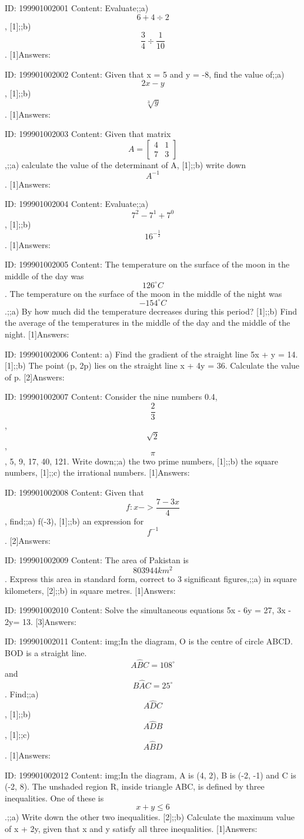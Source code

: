 \documentclass{article}
\begin{document}
ID: 199901002001
Content:
Evaluate;;a) $$6+4\div2$$, [1];;b) $$\frac{3}{4}\div \frac{1}{10}$$. [1]Answers:

ID: 199901002002
Content:
Given that x = 5 and y = -8, find the value of;;a) $$2x - y$$, [1];;b) $$\sqrt[3]{y}$$. [1]Answers:

ID: 199901002003
Content:
Given that matrix $$A=\begin{bmatrix}4&1\\7&3\end{bmatrix}$$,;;a) calculate the value of the determinant of A, [1];;b) write down $$A^{-1}$$. [1]Answers:

ID: 199901002004
Content:
Evaluate;;a) $$7^{2} -7^{1} +7^{0} $$, [1];;b) $$16^{-\frac{1}{2}}$$. [1]Answers:

ID: 199901002005
Content:
The temperature on the surface of the moon in the middle of the day was $$126^{\circ}C$$. The temperature on the surface of the moon in the middle of the night was $$-154^{\circ}C$$.;;a) By how much did the temperature decreases during this period? [1];;b) Find the average of the temperatures in the middle of the day and the middle of the night. [1]Answers:

ID: 199901002006
Content:
a) Find the gradient of the straight line 5x + y = 14. [1];;b) The point (p, 2p) lies on the straight line x + 4y = 36. Calculate the value of p. [2]Answers:

ID: 199901002007
Content:
Consider the nine numbers 0.4, $$\frac{2}{3}$$, $$\sqrt{2}$$, $$\pi$$, 5, 9, 17, 40, 121. Write down;;a) the two prime numbers, [1];;b) the square numbers, [1];;c) the irrational numbers. [1]Answers:

ID: 199901002008
Content:
Given that $$f:x->\frac{7-3x}{4}$$, find;;a) f(-3), [1];;b) an expression for $$f^{-1}$$. [2]Answers:

ID: 199901002009
Content:
The area of Pakistan is $$803944km^{2} $$. Express this area in standard form, correct to 3 significant figures,;;a) in square kilometers, [2];;b) in square metres. [1]Answers:

ID: 199901002010
Content:
Solve the simultaneous equations 5x - 6y = 27, 3x - 2y= 13. [3]Answers:

ID: 199901002011
Content:
img;In the diagram, O is the centre of circle ABCD. BOD is a straight line. $$A \hat BC=108^{\circ}$$ and $$B \hat AC=25^{\circ}$$. Find;;a) $$A \hat DC$$, [1];;b) $$A \hat DB$$, [1];;c) $$A \hat BD$$. [1]Answers:

ID: 199901002012
Content:
img;In the diagram, A is (4, 2), B is (-2, -1) and C is (-2, 8). The unshaded region R, inside triangle ABC, is defined by three inequalities. One of these is $$x+y\leq 6$$.;;a) Write down the other two inequalities. [2];;b) Calculate the maximum value of x + 2y, given that x and y satisfy all three inequalities. [1]Answers:
\end{document}
